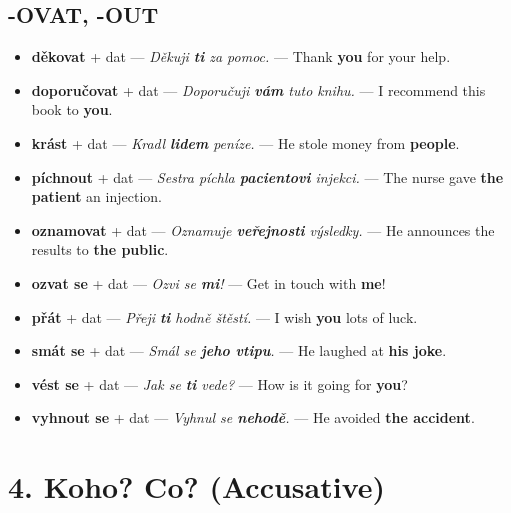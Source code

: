 \documentclass[12pt]{book}
\begin{document}
\subsection*{-OVAT, -OUT}
\begin{itemize}
    \item \textbf{děkovat} + dat --- \textit{Děkuji \textbf{ti} za pomoc.} --- Thank \textbf{you} for your help.
    \item \textbf{doporučovat} + dat --- \textit{Doporučuji \textbf{vám} tuto knihu.} --- I recommend this book to \textbf{you}.
    \item \textbf{krást} + dat --- \textit{Kradl \textbf{lidem} peníze.} --- He stole money from \textbf{people}.
    \item \textbf{píchnout} + dat --- \textit{Sestra píchla \textbf{pacientovi} injekci.} --- The nurse gave \textbf{the patient} an injection.
    \item \textbf{oznamovat} + dat --- \textit{Oznamuje \textbf{veřejnosti} výsledky.} --- He announces the results to \textbf{the public}.
    \item \textbf{ozvat se} + dat --- \textit{Ozvi se \textbf{mi}!} --- Get in touch with \textbf{me}!
    \item \textbf{přát} + dat --- \textit{Přeji \textbf{ti} hodně štěstí.} --- I wish \textbf{you} lots of luck.
    \item \textbf{smát se} + dat --- \textit{Smál se \textbf{jeho vtipu}.} --- He laughed at \textbf{his joke}.
    \item \textbf{vést se} + dat --- \textit{Jak se \textbf{ti} vede?} --- How is it going for \textbf{you}?
    \item \textbf{vyhnout se} + dat --- \textit{Vyhnul se \textbf{nehodě}.} --- He avoided \textbf{the accident}.
\end{itemize}

\section{4. Koho? Co? (Accusative)}
\end{document}
